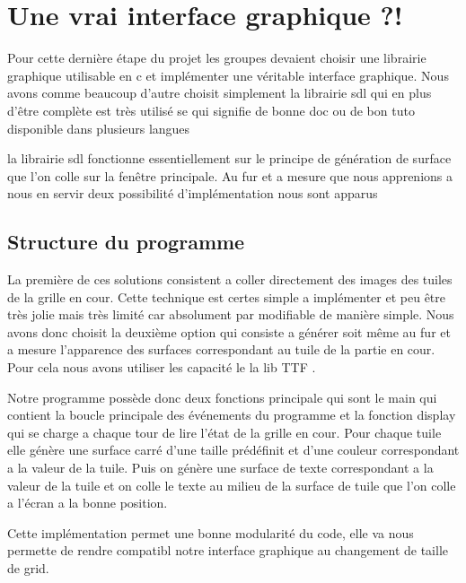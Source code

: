 \documentclass[12pt]{article}
\begin{document}
\newpage
\section{Une vrai interface graphique ?!}
Pour cette dernière étape du projet les groupes devaient choisir une librairie graphique
utilisable en c et implémenter une véritable interface graphique. Nous avons comme
beaucoup d'autre choisit simplement la librairie sdl qui en plus d’être
complète est très utilisé se qui signifie de bonne doc ou de bon tuto disponible
dans plusieurs langues
\par la librairie sdl fonctionne essentiellement sur le principe de génération de
surface que l'on colle sur la fenêtre principale. Au fur et a mesure que nous apprenions a nous en servir
deux possibilité d’implémentation nous sont apparus

\subsection{Structure du programme}
La première de ces solutions consistent a coller directement des images des tuiles de la grille en cour.
Cette technique est certes simple a implémenter et peu être très jolie mais très limité
car absolument par modifiable de manière simple.
Nous avons donc choisit la deuxième option qui consiste a générer soit même au fur et a mesure
l'apparence des surfaces correspondant au tuile de la partie en cour. Pour cela nous avons utiliser
les capacité le la lib \og TTF \fg.
\par Notre programme possède donc deux fonctions principale qui sont le \og main \fg qui contient la boucle
principale des événements du programme et la fonction \og display \fg qui se charge a chaque tour de lire l'état
de la grille en cour. Pour chaque tuile elle génère une surface carré d'une taille prédéfinit et d'une couleur
correspondant a la valeur de la tuile. Puis on génère une surface de texte correspondant a la valeur de la tuile
et on colle le texte au milieu de la surface de tuile que l'on colle a l’écran a la bonne position.
\par Cette implémentation permet une bonne modularité du code, elle va nous permette de rendre compatibl
 notre interface graphique au changement de taille de grid.
\end{document}

